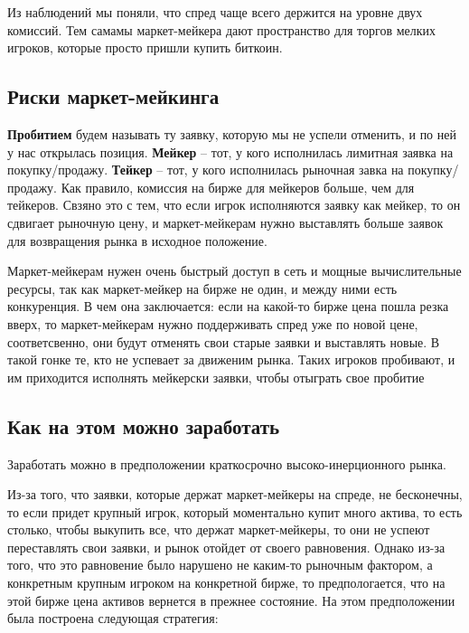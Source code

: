 Из наблюдений мы поняли, что спред чаще всего держится на уровне двух комиссий. Тем самамы маркет-мейкера дают пространство для торгов мелких игроков, которые просто пришли купить биткоин.

\subsection{Риски маркет-мейкинга}

 \textbf{Пробитием} будем называть ту заявку, которую мы не успели отменить, и по ней у нас открылась позиция.
 \textbf{Мейкер} -- тот, у кого исполнилась лимитная заявка на покупку/продажу.
 \textbf{Тейкер} -- тот, у кого исполнилась рыночная завка на покупку/продажу.
\remark Как правило, комиссия на бирже для мейкеров больше, чем для тейкеров. Свзяно это с тем, что если игрок исполняются заявку как мейкер, то  он сдвигает рыночную цену, и маркет-мейкерам нужно выставлять больше заявок для возвращения рынка в исходное положение.

Маркет-мейкерам нужен очень быстрый доступ в сеть и мощные вычислительные ресурсы, так как маркет-мейкер на бирже не один, и между ними есть конкуренция. В чем она заключается: если на какой-то бирже цена пошла резка вверх, то маркет-мейкерам нужно поддерживать спред уже по новой цене, соответсвенно, они будут отменять свои старые заявки и выставлять новые. В такой гонке те, кто не успевает за движеним рынка. Таких игроков пробивают, и им приходится исполнять мейкерски заявки, чтобы отыграть свое пробитие

\subsection{Как на этом можно заработать}

Заработать можно в предположении краткосрочно высоко-инерционного рынка.

Из-за того, что заявки, которые держат маркет-мейкеры на спреде, не бесконечны, то если придет крупный игрок, который моментально купит много актива, то есть столько, чтобы выкупить все, что держат маркет-мейкеры, то они не успеют переставлять свои заявки, и рынок отойдет от своего равновения. Однако из-за того, что это равновение было нарушено не каким-то рыночным фактором, а конкретным крупным игроком на конкретной бирже, то предпологается, что на этой бирже цена активов вернется в прежнее состояние. На этом предположении была построена следующая стратегия:

